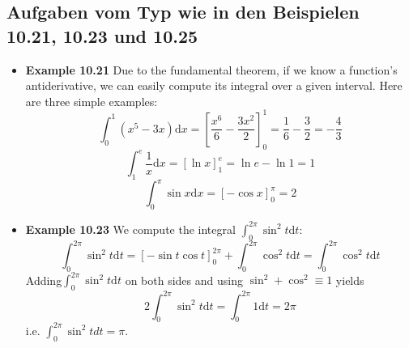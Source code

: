 
\subsection{Aufgaben vom Typ wie in den Beispielen 10.21, 10.23 und 10.25}

\begin{itemize}
\item \textbf{Example 10.21} Due to the fundamental theorem, if we know a function's antiderivative,
we can easily compute its integral over a given interval. Here are three simple
examples:
\begin{equation}
 \int _ { 0} ^ { 1} \left( x ^ { 5} - 3x \right) \text{d} x = \left[ \frac { x ^ { 6} } { 6} - \frac { 3x ^ { 2} } { 2} \right] _ { 0} ^ { 1} = \frac { 1} { 6} - \frac { 3} { 2} = - \frac { 4} { 3}
 \end{equation} 
 \begin{equation}
\int _ { 1} ^ { e } \frac { 1} { x } \text{d} x = [ \ln x ] _ { 1} ^ { e } = \ln e - \ln 1= 1
 \end{equation} 
 \begin{equation}
\int _ { 0} ^ { \pi } \sin x \text{d} x = [ - \cos x ] _ { 0} ^ { \pi } = 2
 \end{equation} 

\item \textbf{Example 10.23} We compute the integral $\int _ { 0} ^ { 2\pi } \sin ^ { 2} t \text{d}t$:
\begin{equation}
\int _ { 0} ^ { 2\pi } \sin ^ { 2} t \text{d} t = [ - \sin t \cos t ] _ { 0} ^ { 2\pi } + \int _ { 0} ^ { 2\pi } \cos ^ { 2} t \text{d} t = \int _ { 0} ^ { 2\pi } \cos ^ { 2} t \text{d} t
\end{equation}
Adding$\int _ { 0} ^ { 2\pi } \sin ^ { 2} t \text{d} t$ on both sides and using $\sin ^ { 2} + \cos ^ { 2} \equiv 1$ yields
\begin{equation}
2\int _ { 0} ^ { 2\pi } \sin ^ { 2} t \text{d} t = \int _ { 0} ^ { 2\pi } 1 \text{d} t = 2\pi
\end{equation}
i.e. $\int _ { 0} ^ { 2\pi } \sin ^ { 2} t d t = \pi$.
 

\end{itemize}
